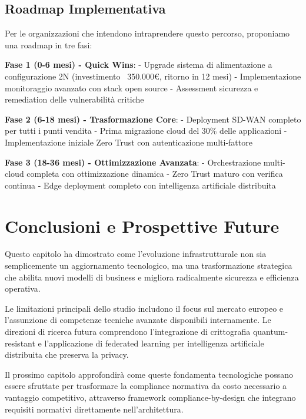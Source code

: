 \subsection{Roadmap Implementativa}

Per le organizzazioni che intendono intraprendere questo percorso, proponiamo una roadmap in tre fasi:

\textbf{Fase 1 (0-6 mesi) - Quick Wins}:
- Upgrade sistema di alimentazione a configurazione 2N (investimento ~350.000€, ritorno in 12 mesi)
- Implementazione monitoraggio avanzato con stack open source
- Assessment sicurezza e remediation delle vulnerabilità critiche

\textbf{Fase 2 (6-18 mesi) - Trasformazione Core}:
- Deployment SD-WAN completo per tutti i punti vendita
- Prima migrazione cloud del 30\% delle applicazioni
- Implementazione iniziale Zero Trust con autenticazione multi-fattore

\textbf{Fase 3 (18-36 mesi) - Ottimizzazione Avanzata}:
- Orchestrazione multi-cloud completa con ottimizzazione dinamica
- Zero Trust maturo con verifica continua
- Edge deployment completo con intelligenza artificiale distribuita

\section{Conclusioni e Prospettive Future}

Questo capitolo ha dimostrato come l'evoluzione infrastrutturale non sia semplicemente un aggiornamento tecnologico, ma una trasformazione strategica che abilita nuovi modelli di business e migliora radicalmente sicurezza e efficienza operativa.

Le limitazioni principali dello studio includono il focus sul mercato europeo e l'assunzione di competenze tecniche avanzate disponibili internamente. Le direzioni di ricerca futura comprendono l'integrazione di crittografia quantum-resistant e l'applicazione di federated learning per intelligenza artificiale distribuita che preserva la privacy.

Il prossimo capitolo approfondirà come queste fondamenta tecnologiche possano essere sfruttate per trasformare la compliance normativa da costo necessario a vantaggio competitivo, attraverso framework compliance-by-design che integrano requisiti normativi direttamente nell'architettura.

